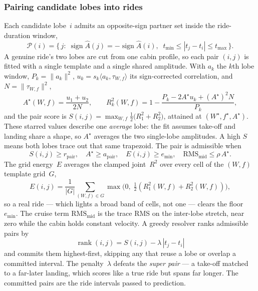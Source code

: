 \documentclass[manuscript,review,screen]{acmart}
\begin{document}
\subsubsection{Pairing candidate lobes into rides}
\label{sec:algo-pair}

Each candidate lobe~$i$ admits an opposite-sign partner set inside
the ride-duration window,
\begin{equation}
  \mathcal{P}(i)=\bigl\{\,j:\;
    \operatorname{sign}\hat A(j)=-\operatorname{sign}\hat A(i),\;\;
    t_{\min}\le |t_j-t_i|\le t_{\max}\,\bigr\}.
  \label{eq:partner-set}
\end{equation}
A genuine ride's two lobes are cut from one cabin profile, so each
pair $(i,j)$ is fitted with a single template and a single shared
amplitude.  With $a_k$ the $k$th lobe window, $P_k=\|a_k\|^{2}$,
$u_k=s_k\langle a_k,\tau_{W,f}\rangle$ its sign-corrected
correlation, and $N=\|\tau_{W,f}\|^{2}$,
\begin{equation}
  A^{\star}(W,f)=\frac{u_1+u_2}{2N},
  \qquad
  R^{2}_k(W,f)=1-\frac{P_k-2A^{\star}u_k+(A^{\star})^{2}N}{P_k},
  \label{eq:joint-fit}
\end{equation}
and the pair score is
$S(i,j)=\max_{W,f}\tfrac12\bigl(R^{2}_1+R^{2}_2\bigr)$, attained at
$(W^{\star},f^{\star},A^{\star})$.  These starred values describe one
\emph{average} lobe: the fit assumes take-off and landing share a
shape, so $A^{\star}$ averages the two single-lobe amplitudes.  A
high $S$ means both lobes trace out that same trapezoid.  The pair is admissible when
\begin{equation}
  S(i,j)\ge r_{\mathrm{pair}},
  \quad
  A^{\star}\ge a_{\mathrm{pair}},
  \quad
  E(i,j)\ge e_{\min},
  \quad
  \mathrm{RMS}_{\mathrm{mid}}\le \rho\,A^{\star}.
  \label{eq:pair-gate}
\end{equation}
The grid energy~$E$ averages the clamped joint~$R^{2}$ over every
cell of the $(W,f)$ template grid~$G$,
\begin{equation}
  E(i,j)=\frac{1}{|G|}\sum_{(W,f)\in G}
    \max\!\bigl(0,\;\tfrac12(R^{2}_1(W,f)+R^{2}_2(W,f))\bigr),
  \label{eq:grid-energy}
\end{equation}
so a real ride --- which lights a broad band of cells, not one ---
clears the floor~$e_{\min}$.  The cruise term
$\mathrm{RMS}_{\mathrm{mid}}$ is the trace RMS on the inter-lobe
stretch, near zero while the cabin holds constant velocity.  A greedy
resolver ranks admissible pairs by
\begin{equation}
  \operatorname{rank}(i,j)=S(i,j)-\lambda\,|t_j-t_i|
  \label{eq:pair-rank}
\end{equation}
and commits them highest-first, skipping any that reuse a lobe or
overlap a committed interval.  The penalty~$\lambda$ defeats the
\emph{super pair} --- a take-off matched to a far-later landing,
which scores like a true ride but spans far longer.  The committed
pairs are the ride intervals passed to prediction.
\end{document}
